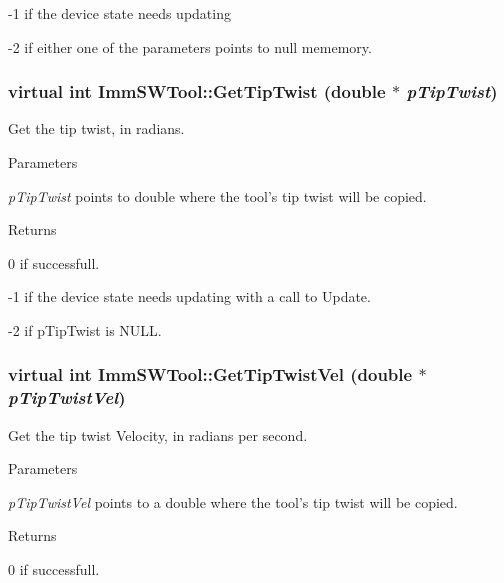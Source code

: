 -\/1 if the device state needs updating

-\/2 if either one of the parameters points to null mememory. \hypertarget{classImmSWTool_a7ed10d0817049e1b8915c8a20439592c}{
\subsubsection[{GetTipTwist}]{\setlength{\rightskip}{0pt plus 5cm}virtual int ImmSWTool::GetTipTwist (double $\ast$ {\em pTipTwist})}}
\label{classImmSWTool_a7ed10d0817049e1b8915c8a20439592c}
Get the tip twist, in radians.


\begin{DoxyParams}{Parameters}
\item[{\em pTipTwist}]points to double where the tool's tip twist will be copied.\end{DoxyParams}
\begin{DoxyReturn}{Returns}

\end{DoxyReturn}
0 if successfull.

-\/1 if the device state needs updating with a call to Update.

-\/2 if pTipTwist is NULL. \hypertarget{classImmSWTool_ac33ef554b842b02a5908e53e8234331a}{
\subsubsection[{GetTipTwistVel}]{\setlength{\rightskip}{0pt plus 5cm}virtual int ImmSWTool::GetTipTwistVel (double $\ast$ {\em pTipTwistVel})}}
\label{classImmSWTool_ac33ef554b842b02a5908e53e8234331a}
Get the tip twist Velocity, in radians per second.


\begin{DoxyParams}{Parameters}
\item[{\em pTipTwistVel}]points to a double where the tool's tip twist will be copied.\end{DoxyParams}
\begin{DoxyReturn}{Returns}

\end{DoxyReturn}
0 if successfull.

